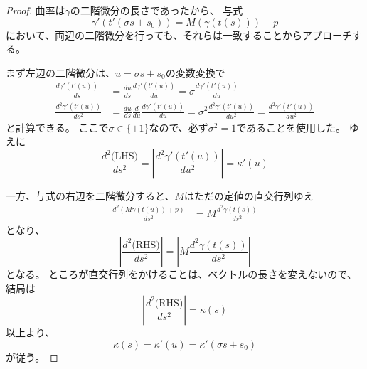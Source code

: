 \begin{proof}
  曲率は$\gamma$の二階微分の長さであったから、
  与式
  \[
    \gamma'(t'(\sigma s+s_0)) = M(\gamma(t(s))) + p
  \]
  において、両辺の二階微分を行っても、それらは一致することからアプローチする。

  まず左辺の二階微分は、$u=\sigma s+s_0$の変数変換で
  \begin{align*}
    \frac{d\gamma'(t'(u))}{ds}&=\frac{du}{ds}\frac{d\gamma'(t'(u))}{du}=\sigma\frac{d\gamma'(t'(u))}{du}\\
    \frac{d^2\gamma'(t'(u))}{ds^2}&=\frac{du}{ds}\frac{d}{du}\frac{d\gamma'(t'(u))}{du}=\sigma^2\frac{d^2\gamma'(t'(u))}{du^2}=\frac{d^2\gamma'(t'(u))}{du^2}
  \end{align*}
  と計算できる。
  ここで$\sigma\in\{\pm1\}$なので、必ず$\sigma^2=1$であることを使用した。
  ゆえに
  \[
    \frac{d^2\text{(LHS)}}{ds^2}=\left|\frac{d^2\gamma'(t'(u))}{du^2}\right|=\kappa'(u)
  \]

  一方、与式の右辺を二階微分すると、$M$はただの定値の直交行列ゆえ
  \begin{align*}
    \frac{d^2(M\gamma(t(u))+p)}{ds^2}&=M\frac{d^2\gamma(t(s))}{ds^2}
  \end{align*}
  となり、
  \[
    \left|\frac{d^2\text{(RHS)}}{ds^2}\right|=\left|M\frac{d^2\gamma(t(s))}{ds^2}\right|
  \]
  となる。
  ところが直交行列をかけることは、ベクトルの長さを変えないので、結局は
  \[
    \left|\frac{d^2\text{(RHS)}}{ds^2}\right|=\kappa(s)
  \]
  以上より、
  \[
    \kappa(s)=\kappa'(u)=\kappa'(\sigma s+s_0)
  \]
  が従う。


\end{proof}
